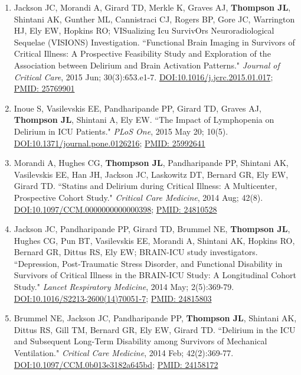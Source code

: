 \documentclass[5pt]{article}
\begin{document}
\begin{enumerate}
\item Jackson JC, Morandi A, Girard TD, Merkle K, Graves AJ, \textbf{Thompson JL}, Shintani AK, Gunther ML, Cannistraci CJ, Rogers BP, Gore JC, Warrington HJ, Ely EW, Hopkins RO; VISualizing Icu SurvivOrs Neuroradiological Sequelae (VISIONS) Investigation. ``Functional Brain Imaging in Survivors of Critical Illness: A Prospective Feasibility Study and Exploration of the Association between Delirium and Brain Activation Patterns." \emph{Journal of Critical Care}, 2015 Jun; 30(3):653.e1-7. \href{https://doi.org/10.1016/j.jcrc.2015.01.017}{DOI:10.1016/j.jcrc.2015.01.017}; \href{https://www.ncbi.nlm.nih.gov/pubmed/25769901}{PMID: 25769901}
\item Inoue S, Vasilevskis EE, Pandharipande PP, Girard TD, Graves AJ, \textbf{Thompson JL}, Shintani A, Ely EW. ``The Impact of Lymphopenia on Delirium in ICU Patients." \emph{PLoS One}, 2015 May 20; 10(5). \href{https://doi.org/10.1371/journal.pone.0126216}{DOI:10.1371/journal.pone.0126216}; \href{https://www.ncbi.nlm.nih.gov/pubmed/25992641}{PMID: 25992641}
\item Morandi A, Hughes CG, \textbf{Thompson JL}, Pandharipande PP, Shintani AK, Vasilevskis EE, Han JH, Jackson JC, Laskowitz DT, Bernard GR, Ely EW, Girard TD. ``Statins and Delirium during Critical Illness: A Multicenter, Prospective Cohort Study." \emph{Critical Care Medicine}, 2014 Aug; 42(8). \href{https://doi.org/10.1097/CCM.0000000000000398}{DOI:10.1097/CCM.0000000000000398}; \href{https://www.ncbi.nlm.nih.gov/pubmed/24810528}{PMID: 24810528}
\item Jackson JC, Pandharipande PP, Girard TD, Brummel NE, \textbf{Thompson JL}, Hughes CG, Pun BT, Vasilevskis EE, Morandi A, Shintani AK, Hopkins RO, Bernard GR, Dittus RS, Ely EW; BRAIN-ICU study investigators. ``Depression, Post-Traumatic Stress Disorder, and Functional Disability in Survivors of Critical Illness in the BRAIN-ICU Study: A Longitudinal Cohort Study." \emph{Lancet Respiratory Medicine}, 2014 May; 2(5):369-79. \href{https://doi.org/10.1016/S2213-2600(14)70051-7}{DOI:10.1016/S2213-2600(14)70051-7}; \href{https://www.ncbi.nlm.nih.gov/pubmed/24815803}{PMID: 24815803}
\item Brummel NE, Jackson JC, Pandharipande PP, \textbf{Thompson JL}, Shintani AK, Dittus RS, Gill TM, Bernard GR, Ely EW, Girard TD. ``Delirium in the ICU and Subsequent Long-Term Disability among Survivors of Mechanical Ventilation." \emph{Critical Care Medicine}, 2014 Feb; 42(2):369-77.\\ \href{https://doi.org/10.1097/CCM.0b013e3182a645bd}{DOI:10.1097/CCM.0b013e3182a645bd}; \href{https://www.ncbi.nlm.nih.gov/pubmed/24158172}{PMID: 24158172}

\end{enumerate}
\end{document}
